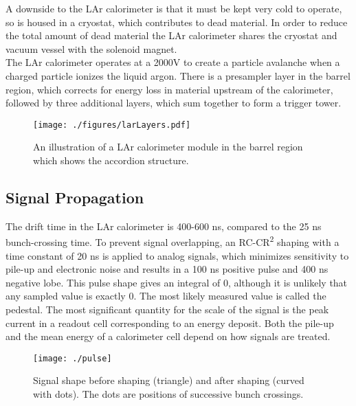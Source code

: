 A downside to the LAr calorimeter is that it must be kept very cold to operate, so is housed in a cryostat, which contributes to dead material.  In order to reduce the total amount of dead material the LAr calorimeter shares the cryostat and vacuum vessel with the solenoid magnet.  \\

The LAr calorimeter operates at a 2000V to create a particle avalanche when a charged particle ionizes the liquid argon.  There is a presampler layer in the barrel region, which corrects for energy loss in material upstream of the calorimeter, followed by three additional layers, which sum together to form a trigger tower.\\

\begin{figure}[h!]
  \centering
	\texttt{[image: ./figures/larLayers.pdf]}
\caption{\label{fig:larLayout}{ An illustration of a LAr calorimeter module in the barrel region which shows the accordion structure. }} %
\end{figure}


\subsection{Signal Propagation}
The drift time in the LAr calorimeter is 400-600 ns, compared to the 25 ns bunch-crossing time.  To prevent signal overlapping, an RC-CR\textsuperscript{2} shaping with a time constant of 20 ns is applied to analog signals, which minimizes sensitivity to pile-up and electronic noise and results in a 100 ns positive pulse and 400 ns negative lobe.  This pulse shape gives an integral of 0, although it is unlikely that any sampled value is exactly 0.  The most likely measured value is called the pedestal.  The most significant quantity for the scale of the signal is the peak current in a readout cell corresponding to an energy deposit.  Both the pile-up and the mean energy of a calorimeter cell depend on how signals are treated.\\

\begin{figure}[h!]
  \centering
	\texttt{[image: ./pulse]}
\caption{\label{fig:larPulse}{ Signal shape before shaping (triangle) and after shaping (curved with dots).  The dots are positions of successive bunch crossings. \color{red}{Replace with higher resolution image, consider newer image.} }} %
\end{figure}


